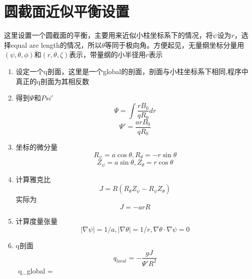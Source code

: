 \documentclass[11pt,a4paper]{article}
\begin{document}
%

\section{圆截面近似平衡设置}

这里设置一个圆截面的平衡，主要用来近似小柱坐标系下的情况，将$\psi$设为$r$，选择equal are length的情况，所以$\theta$等同于极向角。方便起见，无量纲坐标分量用$(\psi,\theta,\phi)$和$(r,\theta,\zeta)$表示，带量纲的小半径用$r$表示

\begin{enumerate}
 	\item 设定一个q剖面，这里是一个global的剖面，剖面与小柱坐标系下相同,程序中真正的q剖面为其相反数
 	\item 得到$\Psi$和$Psi'$
 		$$\Psi = \int \frac{rB_0}{qR_0} dr $$ 
 		$$\Psi' = \frac{arB_0}{qR_0}  $$
	\item 坐标的微分量 
		$$ R_\psi = a\cos\theta, R_\theta = -r\sin\theta $$
		$$ Z_\psi = a\sin\theta, Z_\theta =  r\cos\theta $$
	\item 计算雅克比
		$$ J = R(R_\theta Z_\psi - R_\psi Z_\theta) $$
		实际为
		$$ J = -arR $$
	\item 计算度量张量
		$$ |\nabla\psi| = 1/a, |\nabla\theta| = 1/r, \nabla\theta\cdot\nabla\psi = 0 $$ 
	\item q剖面
		$$ q_{local} = -\frac{gJ}{\Psi'R^2} $$
		$$ q_{global} = 

\end{enumerate}
\end{document}
